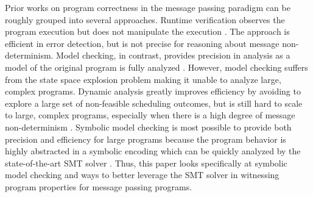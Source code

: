 Prior works on program correctness in the message passing paradigm can be roughly grouped into several approaches. Runtime verification observes the program execution but does not manipulate the execution \cite{DBLP:conf/sc/VetterS00,DBLP:conf/parco/KrammerBMR03,DBLP:conf/ptw/HilbrichSSM09}. The approach is efficient in error detection, but is not precise for reasoning about message non-determinism. Model checking, in contrast, provides precision in analysis as a model of the original program is fully analyzed \cite{DBLP:conf/vmcai/Siegel07,DBLP:conf/pvm/Siegel07}. However, model checking suffers from the state space explosion problem making it unable to analyze large, complex programs. Dynamic analysis greatly improves efficiency by avoiding to explore a large set of non-feasible scheduling outcomes, but is still hard to scale to large, complex programs, especially when there is a high degree of message non-determinism \cite{DBLP:conf/ppopp/VakkalankaSGK08,DBLP:conf/sbmf/SharmaGB12}. 
Symbolic model checking is most possible to provide both precision and efficiency for large programs because the program behavior is highly abstracted in a symbolic encoding which can be quickly analyzed by the state-of-the-art SMT solver \cite{DBLP:conf/kbse/HuangMM13,HuangNFM15,DBLP:conf/fm/ForejtKNS14,DBLP:journals/toplas/ForejtJKNS17}. Thus, this paper looks specifically at symbolic model checking and ways to better leverage the SMT solver in witnessing program properties for message passing programs.

